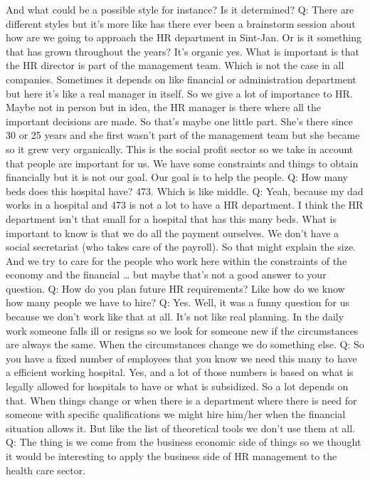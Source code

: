 \documentclass[a4paper,fleqn,11pt,dvips,titlepage]{article}
\numberwithin{figure}{section}
\numberwithin{equation}{section}
\begin{document}
And what could be a possible style for instance? Is it determined? 
Q:  There are different styles but it’s more like has there ever been a brainstorm session about how are we going to approach the HR department in Sint-Jan. Or is it something that has grown throughout the years? 
It’s organic yes. What is important is that the HR director is part of the management team. Which is not the case in all companies. Sometimes it depends on like financial or administration department but here it’s like a real manager in itself. So we give a lot of importance to HR. Maybe not in person but in idea, the HR manager is there where all the important decisions are made. So that’s maybe one little part. She’s there since 30 or 25 years and she first wasn’t part of the management team but she became so it grew very organically. This is the social profit sector so we take in account that people are important for us. We have some constraints and things to obtain financially but it is not our goal. Our goal is to help the people.  
Q: How many beds does this hospital have? 
473. Which is like middle. 
Q: Yeah, because my dad works in a hospital and 473 is not a lot to have a HR department. I think the HR department isn’t that small for a hospital that has this many beds. 
What is important to know is that we do all the payment ourselves. We don’t have a social secretariat (who takes care of the payroll). So that might explain the size. And we try to care for the people who work here within the constraints of the economy and the financial … but maybe that’s not a good answer to your question. 
Q: How do you plan future HR requirements? 
Like how do we know how many people we have to hire? 
Q: Yes.
Well, it was a funny question for us because we don’t work like that at all. It’s not like real planning. In the daily work someone falls ill or resigns so we look for someone new if the circumstances are always the same. When the circumstances change we do something else. 
Q: So you have a fixed number of employees that you know we need this many to have a efficient working hospital. 
Yes, and a lot of those numbers is based on what is legally allowed for hospitals to have or what is subsidized. So a lot depends on that. When things change or when there is a department where there is need for someone with specific qualifications we might hire him/her when the financial situation allows it. But like the list of theoretical tools we don’t use them at all. 
Q: The thing is we come from the business economic side of things so we thought it would be interesting to apply the business side of HR management to the health care sector. 
\end{document}
